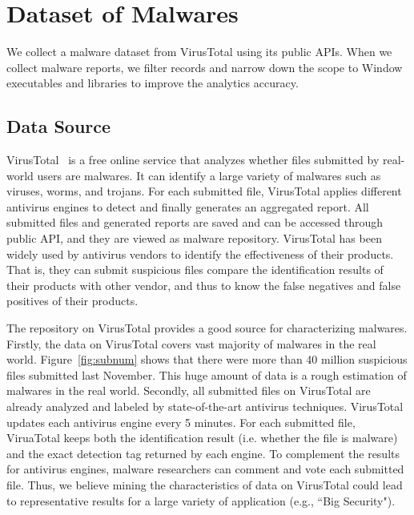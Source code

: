 \section{Dataset of Malwares}
We collect a malware dataset from VirusTotal using its public APIs. When we collect malware reports, we filter records and narrow down the scope to Window executables and libraries to improve the analytics accuracy. 
\subsection{Data Source}
VirusTotal~\cite{virustotal} is a free online service that analyzes whether files submitted by real-world users are malwares. It can identify  a large variety of malwares such as viruses, worms, and trojans. For each submitted file, VirusTotal applies different antivirus engines to detect and finally generates an aggregated report. All submitted files and generated reports are saved and can be accessed through public API, and they are viewed as malware repository. VirusTotal has been widely used by antivirus vendors to identify the effectiveness of their products. That is, they can submit suspicious files compare the identification results of their products with other vendor, and thus to know the false negatives and false positives of their products.


The repository on VirusTotal provides a good source for characterizing malwares. Firstly, the data on VirusTotal covers vast majority of malwares in the real world.
Figure~\ref{fig:subnum} shows that there were more than 40 million suspicious files submitted last November. 
This huge amount of data is a rough estimation of malwares in the real world. 
Secondly, all submitted files on VirusTotal are already analyzed and labeled by state-of-the-art antivirus techniques. VirusTotal updates each antivirus engine every 5 minutes. For each submitted file, ViruaTotal keeps both the identification result (i.e. whether the file is malware) and the exact detection tag returned by each engine. To complement the results for antivirus engines, malware researchers can comment and vote each submitted file. Thus, we believe mining the characteristics of data on VirusTotal could lead to representative results for a large variety of application (e.g., ``Big Security"). 



